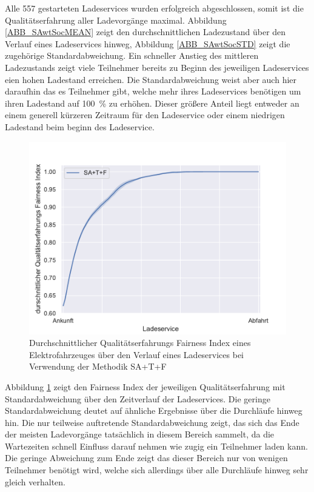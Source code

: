 Alle 557 gestarteten Ladeservices wurden erfolgreich abgeschlossen, somit ist die Qualitätserfahrung aller Ladevorgänge maximal. Abbildung \ref{ABB_SAwtSocMEAN} zeigt den durchschnittlichen Ladezustand über den Verlauf eines Ladeservices hinweg, Abbildung \ref{ABB_SAwtSocSTD} zeigt die zugehörige Standardabweichung. Ein schneller Anstieg des mittleren Ladezustands zeigt viele Teilnehmer bereits zu Beginn des jeweiligen Ladeservices eien hohen Ladestand erreichen. Die Standardabweichung weist aber auch hier daraufhin das es Teilnehmer gibt, welche mehr ihres Ladeservices benötigen um ihren Ladestand auf 100~\% zu erhöhen. Dieser größere Anteil liegt entweder an einem generell kürzeren Zeitraum für den Ladeservice oder einem niedrigen Ladestand beim beginn des Ladeservice.\\
\begin{figure}[htb]
\centering
	\includegraphics[scale=0.45]{img/SA_wT/SlottedAloha_waitingTime_VDE_tau_6_qoe.pdf}
	\caption{Durchschnittlicher Qualitätserfahrungs Fairness Index eines Elektrofahrzeuges über den Verlauf eines Ladeservices bei Verwendung der Methodik SA+T+F}
	\label{Abb_SAwTFairness}
\end{figure}

Abbildung \ref{Abb_SAwTFairness} zeigt den Fairness Index der jeweiligen Qualitätserfahrung mit Standardabweichung über den Zeitverlauf der Ladeservices. Die geringe Standardabweichung deutet auf ähnliche Ergebnisse über die Durchläufe hinweg hin. Die nur teilweise auftretende Standardabweichung zeigt, das sich das Ende der meisten Ladevorgänge tatsächlich in diesem Bereich sammelt, da die Wartezeiten schnell Einfluss darauf nehmen wie zugig ein Teilnehmer laden kann. Die geringe Abweichung zum Ende zeigt das dieser Bereich nur von wenigen Teilnehmer benötigt wird, welche sich allerdings über alle Durchläufe hinweg sehr gleich verhalten.

